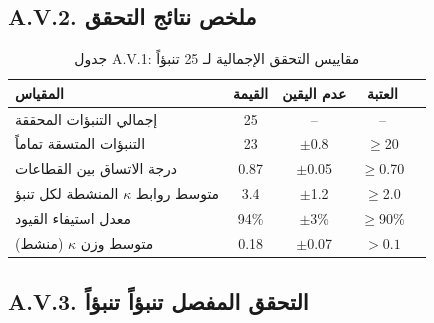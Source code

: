 \documentclass[13pt,a4paper]{article}
\begin{document}
	\subsection*{A.V.2. ملخص نتائج التحقق}
	
	\begin{table}[H]
		\centering
		\small
		\caption{جدول A.V.1: مقاييس التحقق الإجمالية لـ 25 تنبؤاً}
		\begin{tabular}{p{}cccc}
			\toprule
			\textbf{المقياس} & \textbf{القيمة} & \textbf{عدم اليقين} & \textbf{العتبة} \\
			\midrule
			إجمالي التنبؤات المحققة & 25 & -- & -- \\
			التنبؤات المتسقة تماماً & 23 & $\pm$0.8 & $\geq$20 \\
			درجة الاتساق بين القطاعات & 0.87 & $\pm$0.05 & $\geq$0.70 \\
			متوسط روابط $\kappa$ المنشطة لكل تنبؤ & 3.4 & $\pm$1.2 & $\geq$2.0 \\
			معدل استيفاء القيود & 94\% & $\pm$3\% & $\geq$90\% \\
			متوسط وزن $\kappa$ (منشط) & 0.18 & $\pm$0.07 & $>0.1$ \\
			\bottomrule
		\end{tabular}
		\label{tab:validation-summary}
	\end{table}
	
	\subsection*{A.V.3. التحقق المفصل تنبؤاً تنبؤاً}
	
\end{document}
